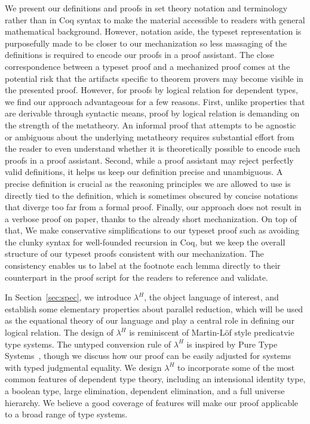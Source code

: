 \documentclass[acmsmall,screen=true,
\ifpublic review=false\else,review=true\fi
  ,anonymous=\ifanonymous true\else false\fi]{acmart}
\newcommand{\lang}{$\lambda^H$\xspace}
\begin{document}
We present our definitions and proofs in set theory notation and
terminology rather than in Coq syntax to make the material accessible
to readers with general mathematical background.
However, notation aside, the typeset representation is
purposefully made to be closer to our mechanization so less massaging
of the definitions is required to encode our proofs in a proof
assistant.
The close correspondence between a typeset proof and a mechanized
proof comes at the potential risk that the artifacts specific to
theorem provers may become visible in the presented proof.
However, for proofs by logical relation for
dependent types, we find our approach advantageous for a few reasons.
First, unlike properties that are derivable through
syntactic means, proof by logical relation is demanding on the
strength of the metatheory. An informal proof that attempts to be
agnostic or ambiguous about the underlying metatheory %
requires substantial
effort from the reader to even understand whether it is theoretically
possible to encode such proofs in a proof assistant.
Second, while a proof assistant may reject perfectly valid
definitions, it helps us keep our definition precise and
unambiguous. A precise definition is crucial as the reasoning
principles we are allowed to use is directly tied to the definition,
which is sometimes obscured by concise notations that diverge too far
from a formal proof.
Finally, our approach does not result in a verbose proof on paper, thanks to
the already short mechanization. On top of that, We make conservative
simplifications to our typeset proof such as avoiding the clunky
syntax for well-founded recursion in Coq, but we keep the overall
structure of our typeset proofs consistent with our mechanization.
The consistency enables us to label at the footnote each lemma
directly to their counterpart in the proof script for the readers to
reference and validate.

In Section~\ref{sec:spec}, we introduce \lang{}, the object language
of interest, and establish some elementary properties about parallel
reduction, which will be used as the equational theory of our language
and play a central role in defining our logical relation. The design
of \lang{} is reminiscent of Martin-Löf style predicatvie type
systems. The untyped conversion rule of \lang{} is inspired by Pure
Type Systems~\citet{barendregt1991introduction}, though we discuss how
our proof can be easily adjusted for systems with typed judgmental
equality.  We design \lang{} to incorporate some of the most common
features of dependent type theory, including an intensional identity
type, a boolean type, large elimination, dependent elimination, and a
full universe hierarchy. We believe a good coverage of features will
make our proof applicable to a broad range of type systems.
\end{document}
